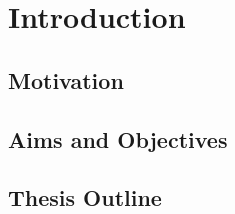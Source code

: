 \chapter{Introduction}\label{ch:intro}
\section{Motivation}






















\section{Aims and Objectives}
 
 











\section{Thesis Outline}

  
